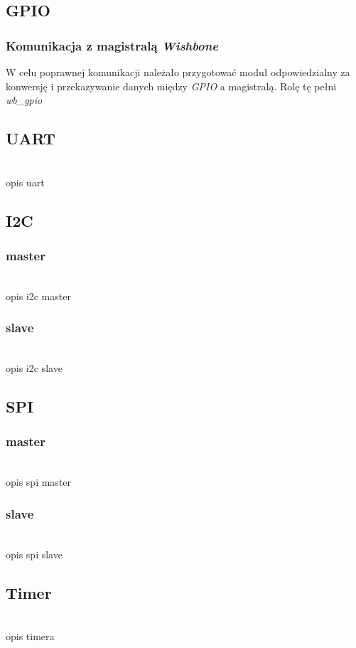 \documentclass[11pt,a4paper]{article}
\begin{document}
	\subsection{GPIO}
		\subsubsection{Komunikacja z magistralą \textit{Wishbone}}
			W celu poprawnej komunikacji należało przygotować moduł odpowiedzialny za konwersję i przekazywanie danych między \textit{GPIO} a magistralą. Rolę tę pełni \textit{wb\_gpio}
	\subsection{UART}
	\hspace{5mm}
		\\opis uart

	\subsection{I2C}
		\subsubsection{master}
		\hspace{5mm}
			\\opis i2c master
		\subsubsection{slave}
		\hspace{5mm}
			\\opis i2c slave

	\subsection{SPI}
		\subsubsection{master}
		\hspace{5mm}
			\\opis spi master
		\subsubsection{slave}
		\hspace{5mm}
			\\opis spi slave

	\subsection{Timer}
	\hspace{5mm}
		\\opis timera
\end{document}
